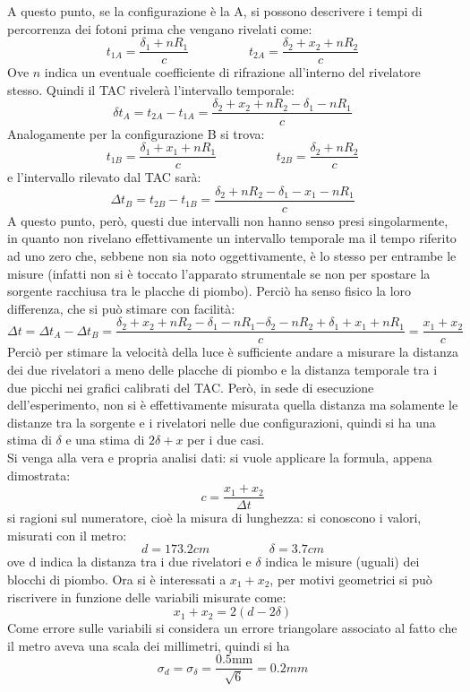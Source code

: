 A questo punto, se la configurazione è la A, si possono descrivere i tempi di percorrenza dei fotoni prima che vengano rivelati come:
$$
  t_{1A} = \frac{\delta_1 + nR_1}{c} \hspace{2cm} t_{2A} = \frac{\delta_2 + x_2 + nR_2}{c}
$$
Ove $n$ indica un eventuale coefficiente di rifrazione all'interno del rivelatore stesso. Quindi il TAC rivelerà l'intervallo temporale:
$$
  \delta t_A = t_{2A} - t_{1A} = \frac{\delta_2 + x_2 + nR_2-\delta_1-nR_1}{c}
$$
Analogamente per la configurazione B si trova:
$$
  t_{1B} = \frac{\delta_1 + x_1 + nR_1}{c} \hspace{2cm} t_{2B} = \frac{\delta_2 + nR_2}{c}
$$
e l'intervallo rilevato dal TAC sarà:
$$
  \Delta t_B = t_{2B} - t_{1B} = \frac{\delta_2 + nR_2 - \delta_1 - x_1 - nR_1}{c}
$$
A questo punto, però, questi due intervalli non hanno senso presi singolarmente, in quanto non rivelano effettivamente un intervallo temporale ma il tempo riferito ad
uno zero che, sebbene non sia noto oggettivamente, è lo stesso per entrambe le misure (infatti non si è toccato l'apparato strumentale se non per spostare la sorgente
racchiusa tra le placche di piombo). Perciò ha senso fisico la loro differenza, che si può stimare con facilità:
$$
  \Delta t = \Delta t_A - \Delta t_B = \frac{{\delta_2 + x_2 + nR_2 - \delta_1 - nR_1}{-\delta_2 - nR_2 + \delta_1 + x_1 + nR_1}}{c} = \frac{x_1 + x_2}{c}
$$
Perciò per stimare la velocità della luce è sufficiente andare a misurare la distanza dei due rivelatori a meno delle placche di piombo e la distanza temporale tra i due
picchi nei grafici calibrati del TAC. Però, in sede di esecuzione dell'esperimento, non si è effettivamente misurata quella distanza ma solamente le distanze tra la sorgente
e i rivelatori nelle due configurazioni, quindi si ha una stima di $\delta$ e una stima di $ 2 \delta + x$ per i due casi.\\

Si venga alla vera e propria analisi dati: si vuole applicare la formula, appena dimostrata:
$$
  c = \frac{x_1+x_2}{\Delta t}
$$
si ragioni sul numeratore, cioè la misura di lunghezza: si conoscono i valori, misurati con il metro:
$$
  d = 173.2 cm \hspace{2cm} \delta = 3.7 cm
$$
ove d indica la distanza tra i due rivelatori e $\delta$ indica le misure (uguali) dei blocchi di piombo.
Ora si è interessati a $x_1+x_2$, per motivi geometrici si può riscrivere in funzione delle variabili misurate come:
$$
  x_1+x_2 = 2 ( d - 2 \delta)
$$
Come errore sulle variabili si considera un errore triangolare associato al fatto che il metro aveva una scala dei millimetri, quindi si ha
$$
  \sigma_d = \sigma_\delta = \frac{0.5\text{mm}}{\sqrt6} = 0.2 mm
$$
\\

